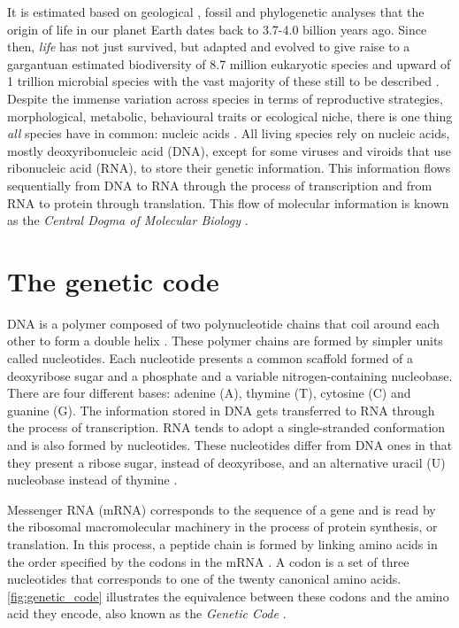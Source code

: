 It is estimated based on geological \cite{SCHIDLOWSKI_1979_LIFE}, fossil \cite{SCHOPF_2007_LIFE} and phylogenetic \cite{BETTS_2018_LIFE} analyses that the origin of life in our planet Earth dates back to 3.7-4.0 billion years ago. Since then, \textit{life} has not just survived, but adapted and evolved to give raise to a gargantuan estimated biodiversity of 8.7 million eukaryotic species \cite{MORA_2011_SPECIES} and upward of 1 trillion microbial species \cite{HUG_2016_SPECIES, LOCEY_2016_SPECIES} with the vast majority of these still to be described \cite{COSTELLO_2013_SPECIES}. Despite the immense variation across species in terms of reproductive strategies, morphological, metabolic, behavioural traits or ecological niche, there is one thing \textit{all} species have in common: nucleic acids \cite{KOONIN_2011_LIFE}. All living species rely on nucleic acids, mostly deoxyribonucleic acid (DNA), except for some viruses \cite{KOONIN_2006_VIRUS} and viroids \cite{NAVARRO_2021_VIROIDS} that use ribonucleic acid (RNA), to store their genetic information. This information flows sequentially from DNA to RNA through the process of transcription and from RNA to protein through translation. This flow of molecular information is known as the \textit{Central Dogma of Molecular Biology} \cite{CRICK_1958_DOGMA, CRICK_1970_DOGMA}.

\section{The genetic code}

DNA is a polymer composed of two polynucleotide chains that coil around each other to form a double helix \cite{WATSON_1953_DNA}. These polymer chains are formed by simpler units called nucleotides. Each nucleotide presents a common scaffold formed of a deoxyribose sugar and a phosphate and a variable nitrogen-containing nucleobase. There are four different bases: adenine (A), thymine (T), cytosine (C) and guanine (G). The information stored in DNA gets transferred to RNA through the process of transcription. RNA tends to adopt a single-stranded conformation and is also formed by nucleotides. These nucleotides differ from DNA ones in that they present a ribose sugar, instead of deoxyribose, and an alternative uracil (U) nucleobase instead of thymine \cite{LEVENE_1909_NUCLEICS}.

Messenger RNA (mRNA) corresponds to the sequence of a gene and is read by the ribosomal macromolecular machinery in the process of protein synthesis, or translation. In this process, a peptide chain is formed by linking amino acids in the order specified by the codons in the mRNA \cite{CRICK_1957_CODE}. A codon is a set of three nucleotides that corresponds to one of the twenty canonical amino acids. \autoref{fig:genetic_code} illustrates the equivalence between these codons and the amino acid they encode, also known as the \textit{Genetic Code} \cite{GAMOW_1954_CODE}.

